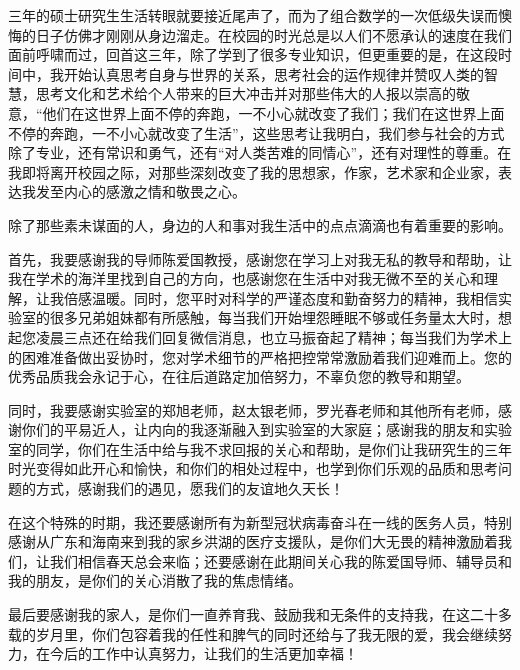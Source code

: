 
\thesisacknowledgement

三年的硕士研究生生活转眼就要接近尾声了，而为了组合数学的一次低级失误而懊悔的日子仿佛才刚刚从身边溜走。在校园的时光总是以人们不愿承认的速度在我们面前呼啸而过，回首这三年，除了学到了很多专业知识，但更重要的是，在这段时间中，我开始认真思考自身与世界的关系，思考社会的运作规律并赞叹人类的智慧，思考文化和艺术给个人带来的巨大冲击并对那些伟大的人报以崇高的敬意，“他们在这世界上面不停的奔跑，一不小心就改变了我们；我们在这世界上面不停的奔跑，一不小心就改变了生活”，这些思考让我明白，我们参与社会的方式除了专业，还有常识和勇气，还有“对人类苦难的同情心”，还有对理性的尊重。在我即将离开校园之际，对那些深刻改变了我的思想家，作家，艺术家和企业家，表达我发至内心的感激之情和敬畏之心。

除了那些素未谋面的人，身边的人和事对我生活中的点点滴滴也有着重要的影响。

首先，我要感谢我的导师陈爱国教授，感谢您在学习上对我无私的教导和帮助，让我在学术的海洋里找到自己的方向，也感谢您在生活中对我无微不至的关心和理解，让我倍感温暖。同时，您平时对科学的严谨态度和勤奋努力的精神，我相信实验室的很多兄弟姐妹都有所感触，每当我们开始埋怨睡眠不够或任务量太大时，想起您凌晨三点还在给我们回复微信消息，也立马振奋起了精神；每当我们为学术上的困难准备做出妥协时，您对学术细节的严格把控常常激励着我们迎难而上。您的优秀品质我会永记于心，在往后道路定加倍努力，不辜负您的教导和期望。

同时，我要感谢实验室的郑旭老师，赵太银老师，罗光春老师和其他所有老师，感谢你们的平易近人，让内向的我逐渐融入到实验室的大家庭；感谢我的朋友和实验室的同学，你们在生活中给与我不求回报的关心和帮助，是你们让我研究生的三年时光变得如此开心和愉快，和你们的相处过程中，也学到你们乐观的品质和思考问题的方式，感谢我们的遇见，愿我们的友谊地久天长！

在这个特殊的时期，我还要感谢所有为新型冠状病毒奋斗在一线的医务人员，特别感谢从广东和海南来到我的家乡洪湖的医疗支援队，是你们大无畏的精神激励着我们，让我们相信春天总会来临；还要感谢在此期间关心我的陈爱国导师、辅导员和我的朋友，是你们的关心消散了我的焦虑情绪。

最后要感谢我的家人，是你们一直养育我、鼓励我和无条件的支持我，在这二十多载的岁月里，你们包容着我的任性和脾气的同时还给与了我无限的爱，我会继续努力，在今后的工作中认真努力，让我们的生活更加幸福！